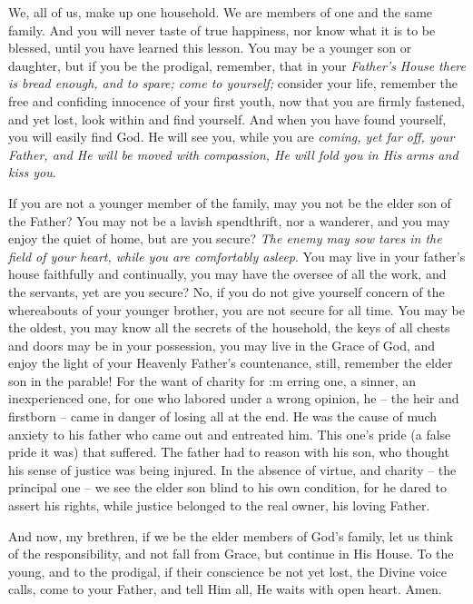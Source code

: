 We, all of us, make up one household. We 
are members of one and the same family. And 
you will never taste of true happiness, nor 
know what it is to be blessed, until you have 
learned this lesson. You may be a younger 
son or daughter, but if you be the prodigal, 
remember, that in your \textit{Father's House there is 
bread enough, and to spare; come to yourself;} 
consider your life, remember the free and confiding
innocence of your first youth, now that 
you are firmly fastened, and yet lost, look within 
and find yourself. And when you have found 
yourself, you will easily find God. He will see 
you, while you are \textit{coming, yet far off, your
Father, and He will be moved with compassion, 
He will fold you in His arms and kiss you}.

If you are not a younger member of the 
family, may you not be the elder son of the 
Father? You may not be a lavish spendthrift, 
nor a wanderer, and you may enjoy the quiet 
of home, but are you secure? \textit{The enemy may 
sow tares in the field of your heart, while you 
are comfortably asleep}. You may live in your 
father's house faithfully and continually, you 
may have the oversee of all the work, and the 
servants, yet are you secure? No, if you do not 
give yourself concern of the whereabouts of 
your younger brother, you are not secure for 
all time. You may be the oldest, you may 
know all the secrets of the household, the keys 
of all chests and doors may be in your possession,
you may live in the Grace of God, and 
enjoy the light of your Heavenly Father's 
countenance, still, remember the elder son in the 
parable! For the want of charity for :m erring 
one, a sinner, an inexperienced one, for one 
who labored under a wrong opinion, he -- the 
heir and firstborn -- came in danger of losing 
all at the end. He was the cause of much 
anxiety to his father who came out and entreated
him. This one's pride (a false pride it
was) that suffered. The father had to reason 
with his son, who thought his sense of justice 
was being injured. In the absence of virtue, 
and charity -- the principal one -- we see the 
elder son blind to his own condition, for he 
dared to assert his rights, while justice belonged 
to the real owner, his loving Father. 

And now, my brethren, if we be the elder 
members of God's family, let us think of the 
responsibility, and not fall from Grace, but continue
in His House. To the young, and to the 
prodigal, if their conscience be not yet lost, the 
Divine voice calls, come to your Father, and 
tell Him all, He waits with open heart. Amen.
